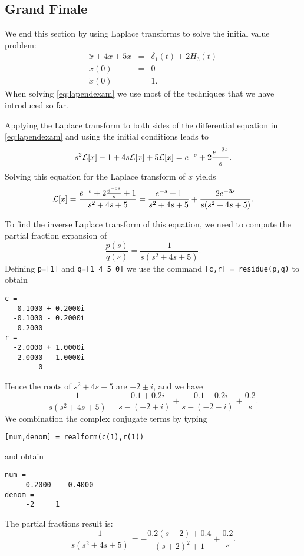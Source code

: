 \documentclass{ximera}
\begin{document}
\subsection*{Grand Finale}

We end this section by using Laplace transforms to solve the initial 
value problem:
\begin{equation}  \label{eq:lapendexam}
\begin{array}{rcl}
\ddot x + 4\dot x +5x  & = & \delta_1(t)+2H_3(t) \\
x(0) & = & 0 \\
\dot x(0) & = & 1.
\end{array}
\end{equation}
When solving \eqref{eq:lapendexam} we use most of the techniques that we have 
introduced so far.  

Applying the Laplace transform to both sides of the differential
equation in \eqref{eq:lapendexam} and using the initial conditions leads to
\[
s^2{\cal L}[x] -1 + 4s{\cal L}[x] + 5{\cal L}[x]=
e^{-s} +2\frac{e^{-3s}}{s}.
\]
Solving this equation for the Laplace transform of $x$ yields
\[
{\cal L}[x] = \frac{e^{-s} +2\frac{e^{-3s}}{s}+1}{s^2+4s+5}
= \frac{e^{-s}+1}{s^2+4s+5}+ \frac{2e^{-3s}}{s(s^2+4s+5)}.
\]

To find the inverse Laplace transform
of this equation, we need to 
compute the partial fraction expansion of 
\[
\frac{p(s)}{q(s)} = \frac{1}{s(s^2+4s+5)}.
\]
Defining {\tt p=[1]} and {\tt q=[1 4 5 0]} we use the 
command {\tt [c,r] = residue(p,q)} to obtain 
\begin{verbatim}
c =
  -0.1000 + 0.2000i
  -0.1000 - 0.2000i
   0.2000          
r =
  -2.0000 + 1.0000i
  -2.0000 - 1.0000i
        0          
\end{verbatim}

Hence the roots of $s^2+4s+5$ are $-2\pm i$, and we have
\[
\frac{1}{s(s^2+4s+5)} = \frac{-0.1 + 0.2i}{s-(-2+i)}+
\frac{-0.1-0.2i}{s-(-2-i)}+\frac{0.2}{s}.
\]
We combination the complex conjugate terms by typing
\begin{verbatim}
[num,denom] = realform(c(1),r(1))
\end{verbatim}
and obtain
\begin{verbatim}
num =
    -0.2000   -0.4000
denom =
     -2     1
\end{verbatim}
The partial fractions result is:
\[
\frac{1}{s(s^2+4s+5)} = -\frac{0.2(s+2)+0.4}{(s+2)^2+1}
+\frac{0.2}{s}.
\]
\end{document}

